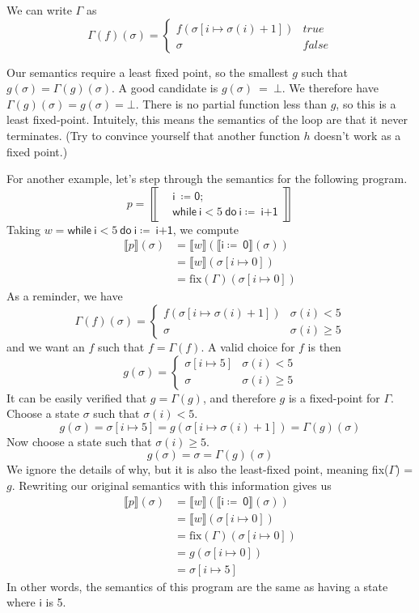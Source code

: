 \documentclass{lecturenotes}
\newcommand{\sem}[1]{\llbracket #1 \rrbracket}
\newcommand{\semapp}[2]{\sem{#1}(#2)}
\newcommand{\semappsig}[1]{\semapp{#1}{\sigma}}
\newcommand{\imp}[1]{\textsf{#1}}
\begin{document}
We can write $\Gamma$ as
\[
  \Gamma(f)(\sigma) = \begin{cases}
    f(\sigma[i \mapsto \sigma(i) + 1]) & true \\
    \sigma & false
  \end{cases}
\]

\noindent Our semantics require a least fixed point, so the smallest $g$ such that $g(\sigma) = \Gamma(g)(\sigma)$.
A good candidate is $g(\sigma)~=~\bot$.
We therefore have $\Gamma(g)(\sigma) = g(\sigma) = \bot$.
There is no partial function less than $g$, so this is a least fixed-point.
Intuitely, this means the semantics of the loop are that it never terminates.
(Try to convince yourself that another function $h$ doesn't work as a fixed point.)

\noindent For another example, let's step through the semantics for the following program.
\[
  p = \left\llbracket
  \begin{aligned}
    & \imp{i}~\coloneq \imp{0};\\
    & \imp{while}~\imp{i}<5~\imp{do}~\imp{i}\coloneq~\imp{i+1}
  \end{aligned}
  \right\rrbracket
\]
Taking $w = \imp{while}~\imp{i}<5~\imp{do}~\imp{i}\coloneq~\imp{i+1}$, we compute
\begin{align*}
  \semappsig{p} & = \semapp{w}{\semappsig{\imp{i}\coloneq~\imp{0}}}\\
  & = \semapp{w}{\sigma[i \mapsto 0]}\\
  & = \text{fix}(\Gamma)(\sigma[i \mapsto 0])
\end{align*}
As a reminder, we have
\[
  \Gamma(f)(\sigma) = \begin{cases}
    f(\sigma[i \mapsto \sigma(i) + 1]) & \sigma(i) < 5 \\
    \sigma & \sigma(i) \ge 5
  \end{cases}
\]
and we want an $f$ such that $f = \Gamma(f)$.
A valid choice for $f$ is then
\[
  g(\sigma) = \begin{cases}
    \sigma[i \mapsto 5] & \sigma(i) < 5\\
    \sigma & \sigma(i) \ge 5
  \end{cases}
\]
It can be easily verified that $g = \Gamma(g)$, and therefore $g$ is a fixed-point for $\Gamma$.
Choose a state $\sigma$ such that $\sigma(i) < 5$.
\[
  g(\sigma) = \sigma[i \mapsto 5] = g(\sigma[i \mapsto \sigma(i) + 1]) = \Gamma(g)(\sigma)
\]
Now choose a state such that $\sigma(i) \ge 5$.
\[
  g(\sigma) = \sigma = \Gamma(g)(\sigma)
\]
We ignore the details of why, but it is also the least-fixed point, meaning fix($\Gamma$) = $g$.
Rewriting our original semantics with this information gives us
\begin{align*}
  \semappsig{p} & = \semapp{w}{\semappsig{\imp{i}\coloneq~\imp{0}}}\\
  & = \semapp{w}{\sigma[i \mapsto 0]}\\
  & = \text{fix}(\Gamma)(\sigma[i \mapsto 0])\\
  & = g(\sigma[i \mapsto 0])\\
  & = \sigma[i \mapsto 5]
\end{align*}
In other words, the semantics of this program are the same as having a state where $\imp{i}$ is 5.
\end{document}
